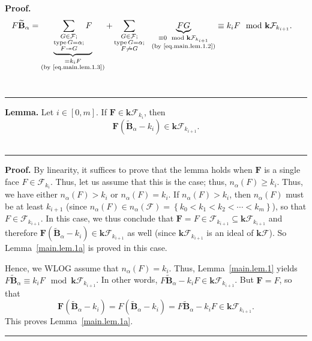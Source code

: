 \documentclass[12pt]{article}
\theoremstyle{definition}%
\newtheorem{lem}[thm]{Lemma}
\theoremstyle{definition}%
\theoremstyle{remark}%
\newcommand{\tup}[1]{\left( #1 \right)}
\newcommand{\interval}[1]{\left[ #1 \right]} %
\newcommand{\set}[1]{\left\{ #1 \right\}}
\newcommand{\kk}{\mathbf{k}}
\newcommand{\kf}{\kk\mathcal{F}}
\newcommand{\BBta}{\widetilde{\mathbf{B}}_{\alpha}}
\newcommand{\FF}{\mathbf{F}}
\newcommand{\CF}{\mathcal{F}}
\newcommand{\na}{n_{ \alpha } }%
\newcommand{\type}{\operatorname{type}}
\newcommand{\con}{\twoheadrightarrow} %
\newenvironment{lem}[1][Lemma]{\noindent\textbf{#1.} }{\ \rule{0.5em}{0.5em}}
\newenvironment{proof}[1][Proof]{\noindent\textbf{#1.} }{\ \rule{0.5em}{0.5em}}
\begin{document}
\begin{proof}
   \begin{align*}
       F\BBta
       &= \underbrace{\sum_{\substack{G \in \CF; \\ \type G = \alpha; \\ F \con G}} F}_{\substack{= k_i F \\ \text{(by \eqref{eq.main.lem.1.3})}}}
	   + \sum_{\substack{G \in \CF; \\ \type G = \alpha; \\ F \not\con G}}\ \ \underbrace{FG}_{\substack{\equiv 0 \mod \kf_{k_{i+1}} \\ \text{(by \eqref{eq.main.lem.1.2})}}}
	   \equiv k_i F \mod \kf_{k_{i+1}}.
   \end{align*}
\end{proof}

\begin{lem}
    \label{main.lem.1a}
    Let $i \in \interval{0, m}$. If $\FF \in \kf_{k_i}$, then
    \[
    \FF \tup{\BBta - k_i} \in \kf_{k_{i+1}}.
    \]
\end{lem}

\begin{proof}
By linearity, it suffices to prove that the lemma holds when $\FF$ is a single face $ F \in \CF_{k_i}$.
Thus, let us assume that this is the case; thus, $ \na\tup{ F } \ge k_i $.
Thus, we have either $ \na\tup{ F } > k_i $ or $ \na\tup{ F } = k_i $.
If $ \na\tup{ F } > k_i $, then $\na\tup{F}$ must be at least $ k_{i+1} $
(since 
$\na\tup{F} \in \na\tup{ \CF } = \set{k_0 < k_1 < k_2 < \cdots  < k_{m}} $),
so that $ F \in \CF_{k_{i+1}} $.
In this case, we thus conclude that $\FF = F \in \CF_{k_{i+1}}
\subseteq \kf_{k_{i+1}}$ and therefore
$\FF \tup{\BBta - k_i} \in \kf_{k_{i+1}}$ as well (since
$ \kf_{k_{i+1}} $ is an ideal of $ \kf $).
So Lemma~\ref{main.lem.1a} is proved in this case.

Hence, we WLOG assume that $\na\tup{F} = k_i$.
Thus, Lemma~\ref{main.lem.1} yields
$F\BBta \equiv k_i F \mod  \kf_{k_{i+1}}$.
In other words, $F \BBta - k_i F \in \kf_{k_{i+1}}$.
But $\FF = F$, so that
\[
\FF \tup{\BBta - k_i}
= F \tup{\BBta - k_i}
= F \BBta - k_i F \in \kf_{k_{i+1}}.
\]
This proves Lemma~\ref{main.lem.1a}.
\end{proof}
\end{document}
